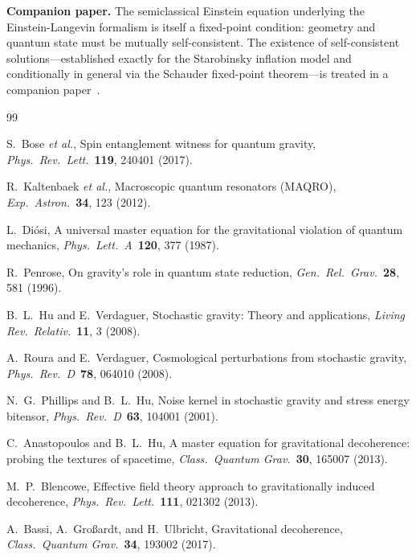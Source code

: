 \documentclass[12pt,a4paper]{article}
\theoremstyle{remark}
\begin{document}
\textbf{Companion paper.} The semiclassical Einstein equation underlying the
Einstein-Langevin formalism is itself a fixed-point condition: geometry and quantum state
must be mutually self-consistent. The existence of self-consistent solutions---established
exactly for the Starobinsky inflation model and conditionally in general via the Schauder
fixed-point theorem---is treated in a companion paper~\cite{fixed_point}.

\begin{thebibliography}{99}

 S.~Bose \textit{et al.}, Spin entanglement witness for quantum gravity,
\textit{Phys.\ Rev.\ Lett.}\ \textbf{119}, 240401 (2017).

 R.~Kaltenbaek \textit{et al.}, Macroscopic quantum resonators (MAQRO),
\textit{Exp.\ Astron.}\ \textbf{34}, 123 (2012).

 L.~Di\'osi, A universal master equation for the gravitational violation
of quantum mechanics, \textit{Phys.\ Lett.\ A}\ \textbf{120}, 377 (1987).

 R.~Penrose, On gravity's role in quantum state reduction,
\textit{Gen.\ Rel.\ Grav.}\ \textbf{28}, 581 (1996).

 B.~L.~Hu and E.~Verdaguer, Stochastic gravity: Theory and
applications, \textit{Living Rev.\ Relativ.}\ \textbf{11}, 3 (2008).

 A.~Roura and E.~Verdaguer, Cosmological perturbations from
stochastic gravity, \textit{Phys.\ Rev.\ D}\ \textbf{78}, 064010 (2008).

 N.~G.~Phillips and B.~L.~Hu, Noise kernel in stochastic gravity and
stress energy bitensor, \textit{Phys.\ Rev.\ D}\ \textbf{63}, 104001 (2001).

 C.~Anastopoulos and B.~L.~Hu, A master equation for
gravitational decoherence: probing the textures of spacetime,
\textit{Class.\ Quantum Grav.}\ \textbf{30}, 165007 (2013).

 M.~P.~Blencowe, Effective field theory approach to gravitationally
induced decoherence, \textit{Phys.\ Rev.\ Lett.}\ \textbf{111}, 021302 (2013).

 A.~Bassi, A.~Gro\ss ardt, and H.~Ulbricht, Gravitational
decoherence, \textit{Class.\ Quantum Grav.}\ \textbf{34}, 193002 (2017).


\end{thebibliography}
\end{document}
